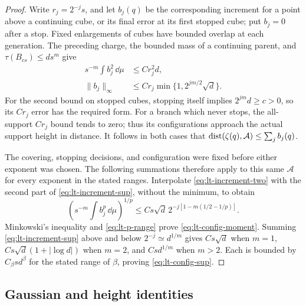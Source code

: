 \begin{proof}
Write $r_j=2^{-j}s$, and let $b_j(q)$ be the corresponding increment for a
point above a continuing cube, or its final error at its first stopped
cube; put $b_j=0$ after a stop.  Fixed enlargements of cubes have bounded
overlap at each generation.  The preceding charge, the bounded mass of a
continuing parent, and $\tau(B_{cs})\le d s^m$ give
\begin{align}
 s^{-m}\int b_j^2\,\dd\mu&\le C r_j^2d,
                         \label{eq:lt-increment-two}\\
 \|b_j\|_\infty&\le C r_j
          \min\{1,2^{jm/2}\sqrt d\}.
                         \label{eq:lt-increment-sup}
\end{align}
For the second bound on stopped cubes, stopping itself implies
$2^{jm}d\ge c>0$, so its $Cr_j$ error has the required form.
For a branch which never stops, the all-support $Cr_j$ bound tends to zero;
thus its configurations approach the actual support height in distance.
It follows in both cases that
$\operatorname{dist}(\zeta(q),\mathcal A)\le\sum_jb_j(q)$.

The covering, stopping decisions, and configuration were fixed before
either exponent was chosen.  The following summations therefore apply to
this same $\mathcal A$ for every exponent in the stated ranges.
Interpolate \eqref{eq:lt-increment-two} with the second part of
\eqref{eq:lt-increment-sup}, without the minimum, to obtain
\[
 \left(s^{-m}\int b_j^p\,\dd\mu\right)^{1/p}
 \le Cs\sqrt d\,2^{-j[1-m(1/2-1/p)]}.
\]
Minkowski's inequality and \eqref{eq:lt-p-range} prove
\eqref{eq:lt-config-moment}.  Summing
\eqref{eq:lt-increment-sup} above and below $2^{-j}\simeq d^{1/m}$ gives
$Cs\sqrt d$ when $m=1$, $Cs\sqrt d(1+|\log d|)$ when $m=2$, and
$Cs d^{1/m}$ when $m>2$.  Each is bounded by $C_\beta s d^\beta$ for the
stated range of $\beta$, proving \eqref{eq:lt-config-sup}.
\end{proof}

\subsection{Gaussian and height identities}

